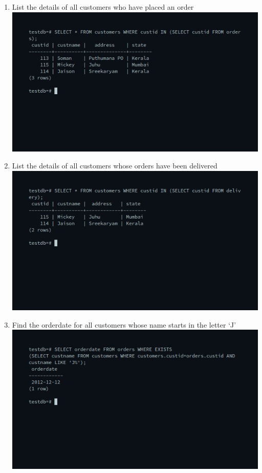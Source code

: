 \documentclass[10pt,a4paper,titlepage]{report}
\begin{document}
{\begin{enumerate}
	\item List the details of all customers who have placed an order\newline
	\includegraphics[width=\linewidth]{../Images/Joins/1.png}
	\item List the details of all customers whose orders have been delivered\newline
	\includegraphics[width=\linewidth]{../Images/Joins/2.png}
	\item Find the orderdate for all customers whose name starts in the letter ‘J’\newline
	\includegraphics[width=\linewidth]{../Images/Joins/3.png}

\end{enumerate}}
\end{document}
